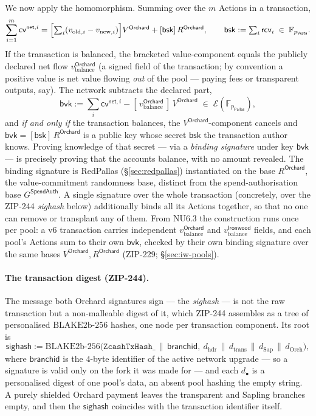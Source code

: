 \documentclass[11pt,a4paper]{article}
\theoremstyle{definition}
\newcommand{\F}{\mathbb{F}}
\newcommand{\cvsym}{\mathsf{cv}}
\newcommand{\Pallas}{\ensuremath{\mathsf{Pallas}}}
\newcommand{\Vesta}{\ensuremath{\mathsf{Vesta}}}
\newcommand{\Ep}{\ensuremath{\mathcal{E}}}
\newcommand{\rcv}{\ensuremath{\mathsf{rcv}}}
\begin{document}
We now apply the homomorphism. Summing over the $m$ Actions in a transaction,
\[
\sum_{i=1}^{m} \cvsym^{\mathsf{net},i} = \Bigl[\textstyle\sum_i (v_{\mathrm{old},i} - v_{\mathrm{new},i})\Bigr] V^{\mathsf{Orchard}} + [\mathsf{bsk}]\,R^{\mathsf{Orchard}}, \qquad \mathsf{bsk} := \sum_i \rcv_i \;\in\; \F_{p_{\Vesta}}.
\]
If the transaction is balanced, the bracketed value-component equals the
publicly declared net flow $v_{\mathrm{balance}}^{\mathsf{Orchard}}$ (a
signed field of the transaction; by convention a positive value is net value
flowing \emph{out} of the pool --- paying fees or transparent
outputs, say).
The network subtracts the declared part,
\[
\mathsf{bvk} := \sum_i \cvsym^{\mathsf{net},i} - [\,v_{\mathrm{balance}}^{\mathsf{Orchard}}\,]\,V^{\mathsf{Orchard}} \;\in\; \Ep(\F_{p_{\Pallas}}),
\]
and \emph{if and only if} the transaction balances, the
$V^{\mathsf{Orchard}}$-component cancels and $\mathsf{bvk} = [\mathsf{bsk}]\,
R^{\mathsf{Orchard}}$ is a public key whose secret $\mathsf{bsk}$ the
transaction author knows. Proving knowledge of that secret --- via a
\emph{binding signature} under key $\mathsf{bvk}$ --- is precisely
proving that the accounts balance, with no amount revealed. The binding
signature is RedPallas (\S\ref{sec:redpallas}) instantiated on the base
$R^{\mathsf{Orchard}}$, the value-commitment randomness base, distinct from
the spend-authorisation base $G^{\mathsf{SpendAuth}}$. A single signature
over the whole transaction (concretely, over the ZIP-244 \emph{sighash} below)
additionally binds all its Actions together, so that
no one can remove or transplant any of them. From NU6.3 the construction
runs once per pool: a v6 transaction carries independent
$v_{\mathrm{balance}}^{\mathsf{Orchard}}$ and
$v_{\mathrm{balance}}^{\mathsf{Ironwood}}$ fields, and each pool's Actions
sum to their own $\mathsf{bvk}$, checked by their own binding signature over
the same bases $V^{\mathsf{Orchard}}, R^{\mathsf{Orchard}}$ (ZIP-229;
\S\ref{sec:iw-pools}).

\paragraph{The transaction digest (ZIP-244).} The message both Orchard
signatures sign --- the \emph{sighash} --- is not the raw transaction but a
non-malleable digest of it, which ZIP-244 assembles as a tree of personalised
$\mathrm{BLAKE2b\text{-}256}$ hashes, one node per transaction component. Its
root is
\[
\mathsf{sighash} := \mathrm{BLAKE2b\text{-}256}\bigl(\texttt{ZcashTxHash\_} \,\|\, \mathsf{branchid},\ d_{\mathrm{hdr}} \,\|\, d_{\mathrm{trans}} \,\|\, d_{\mathrm{Sap}} \,\|\, d_{\mathrm{Orch}}\bigr),
\]
where $\mathsf{branchid}$ is the $4$-byte identifier of the active network
upgrade --- so a signature is valid only on the fork it was made for --- and
each $d_\bullet$ is a personalised digest of one pool's data, an absent pool
hashing the empty string. A purely shielded Orchard payment leaves the
transparent and Sapling branches empty, and then the $\mathsf{sighash}$
coincides with the transaction identifier itself.
\end{document}
